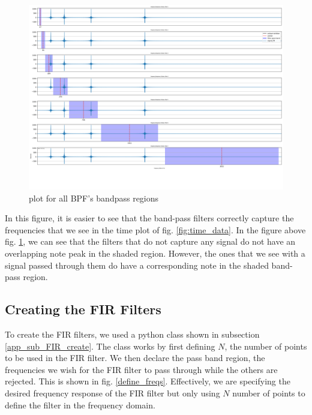 \documentclass[a4paper, 11pt]{exam}
\begin{document}
\begin{figure}[h!]
  \centering
  \hspace*{-1.5cm}\includegraphics[width=17cm]{../images/fft_freqdata.png}
  \caption{plot for all BPF's bandpass regions}
  \label{fig:bandpass_regions}
\end{figure}
In this figure, it is easier to see that the band-pass filters correctly capture the frequencies that we see in the time plot of fig. \ref{fig:time_data}. In the figure above fig. \ref{fig:bandpass_regions}, we can see that the filters that do not capture any signal do not have an overlapping note peak in the shaded region. However, the ones that we see with a signal passed through them do have a corresponding note in the shaded band-pass region. 

\subsection{Creating the FIR Filters}
To create the FIR filters, we used a python class shown in subsection \ref{app_sub_FIR_create}. The class works by first defining $N$, the number of points to be used in the FIR filter. We then declare the pass band region, the frequencies we wish for the FIR filter to pass through while the others are rejected. This is shown in fig. \ref{define_freqs}. Effectively, we are specifying the desired frequency response of the FIR filter but only using $N$ number of points to define the filter in the frequency domain.
\end{document}
